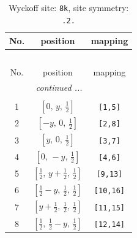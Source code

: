 \documentclass[fleqn,8pt]{jsarticle}
\begin{document}
\begin{longtable}{ccc}
\caption{Wyckoff site: {\tt 8k}, site symmetry: {\tt .2.}}
 \\
 \hline \hline
No. & position & mapping \\ \hline \endfirsthead

\multicolumn{2}{l}{\tablename\ \thetable{}} \\
 \hline \hline
No. & position & mapping \\ \hline \endhead

 \hline \hline
\multicolumn{2}{r}{\footnotesize\it continued ...} \\ \endfoot

 \hline \hline
\multicolumn{2}{r}{} \\ \endlastfoot

1 & $\left[ 0,\, y,\, \frac{1}{2} \right]$ & {\tt [1,5]} \\ \hline
2 & $\left[ - y,\, 0,\, \frac{1}{2} \right]$ & {\tt [2,8]} \\ \hline
3 & $\left[ y,\, 0,\, \frac{1}{2} \right]$ & {\tt [3,7]} \\ \hline
4 & $\left[ 0,\, - y,\, \frac{1}{2} \right]$ & {\tt [4,6]} \\ \hline
5 & $\left[ \frac{1}{2},\, y + \frac{1}{2},\, \frac{1}{2} \right]$ & {\tt [9,13]} \\ \hline
6 & $\left[ \frac{1}{2} - y,\, \frac{1}{2},\, \frac{1}{2} \right]$ & {\tt [10,16]} \\ \hline
7 & $\left[ y + \frac{1}{2},\, \frac{1}{2},\, \frac{1}{2} \right]$ & {\tt [11,15]} \\ \hline
8 & $\left[ \frac{1}{2},\, \frac{1}{2} - y,\, \frac{1}{2} \right]$ & {\tt [12,14]} \\
\end{longtable}
\renewcommand{\arraystretch}{1.2}
\end{document}

